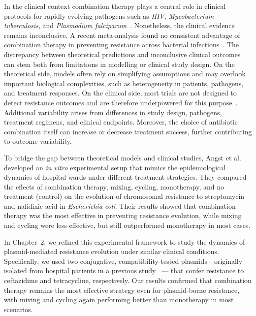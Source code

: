\documentclass[../main.tex]{subfiles}
\begin{document}
In the clinical context combination therapy plays a central role in clinical protocols for rapidly evolving pathogens such as \textit{HIV}, \textit{Mycobacterium tuberculosis}, and \textit{Plasmodium falciparum}~\cite{Goldberg2012}.
Nonetheless, the clinical evidence remains inconclusive.
A recent meta-analysis found no consistent advantage of combination therapy in preventing resistance across bacterial infections~\cite{siedentop_metaanalysis_2024}.
The discrepancy between theoretical predictions and inconclusive clinical outcomes can stem both from limitations in modelling or clinical study design.
On the theoretical side, models often rely on simplifying assumptions and may overlook important biological complexities, such as heterogeneity in patients, pathogens, and treatment responses.
On the clinical side, most trials are not designed to detect resistance outcomes and are therefore underpowered for this purpose~\cite{siedentop_metaanalysis_2024}.
Additional variability arises from differences in study design, pathogens, treatment regimens, and clinical endpoints.
Moreover, the choice of antibiotic combination itself can increase or decrease treatment success, further contributing to outcome variability.

To bridge the gap between theoretical models and clinical studies, Angst et al.~\cite{Angst2021} developed an \textit{in vitro} experimental setup that mimics the epidemiological dynamics of hospital wards under different treatment strategies.
They compared the effects of combination therapy, mixing, cycling, monotherapy, and no treatment (control) on the evolution of chromosomal resistance to streptomycin and nalidixic acid in \textit{Escherichia coli}.
Their results showed that combination therapy was the most effective in preventing resistance evolution, while mixing and cycling were less effective, but still outperformed monotherapy in most cases.

In Chapter~2, we refined this experimental framework to study the dynamics of plasmid-mediated resistance evolution under similar clinical conditions.
Specifically, we used two conjugative, compatibility-tested plasmids—originally isolated from hospital patients in a previous study~\cite{Sutter2016} --- that confer resistance to ceftazidime and tetracycline, respectively.
Our results confirmed that combination therapy remains the most effective strategy even for plasmid-borne resistance, with mixing and cycling again performing better than monotherapy in most scenarios.
\end{document}
